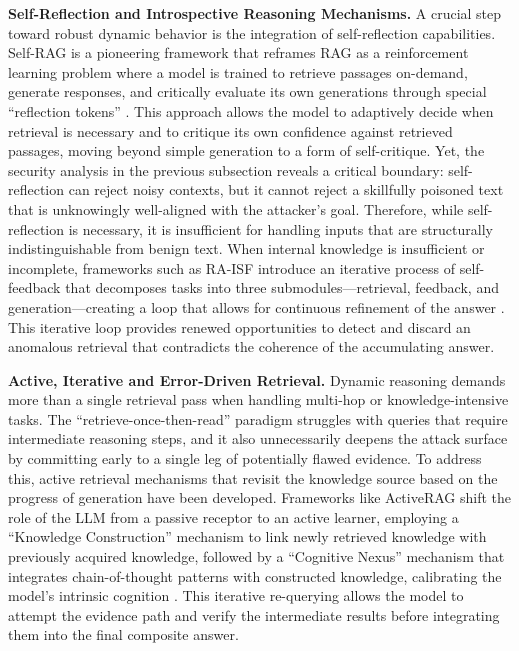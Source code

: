 \documentclass[11pt]{article}
\begin{document}
\textbf{Self-Reflection and Introspective Reasoning Mechanisms.} A crucial step toward robust dynamic behavior is the integration of self-reflection capabilities. Self-RAG is a pioneering framework that reframes RAG as a reinforcement learning problem where a model is trained to retrieve passages on-demand, generate responses, and critically evaluate its own generations through special ``reflection tokens'' \cite{ref109}. This approach allows the model to adaptively decide when retrieval is necessary and to critique its own confidence against retrieved passages, moving beyond simple generation to a form of self-critique. Yet, the security analysis in the previous subsection reveals a critical boundary: self-reflection can reject noisy contexts, but it cannot reject a skillfully poisoned text that is unknowingly well-aligned with the attacker's goal. Therefore, while self-reflection is necessary, it is insufficient for handling inputs that are structurally indistinguishable from benign text. When internal knowledge is insufficient or incomplete, frameworks such as RA-ISF introduce an iterative process of self-feedback that decomposes tasks into three submodules---retrieval, feedback, and generation---creating a loop that allows for continuous refinement of the answer \cite{ref5}. This iterative loop provides renewed opportunities to detect and discard an anomalous retrieval that contradicts the coherence of the accumulating answer.

\textbf{Active, Iterative and Error-Driven Retrieval.} Dynamic reasoning demands more than a single retrieval pass when handling multi-hop or knowledge-intensive tasks. The ``retrieve-once-then-read'' paradigm struggles with queries that require intermediate reasoning steps, and it also unnecessarily deepens the attack surface by committing early to a single leg of potentially flawed evidence. To address this, active retrieval mechanisms that revisit the knowledge source based on the progress of generation have been developed. Frameworks like ActiveRAG shift the role of the LLM from a passive receptor to an active learner, employing a ``Knowledge Construction'' mechanism to link newly retrieved knowledge with previously acquired knowledge, followed by a ``Cognitive Nexus'' mechanism that integrates chain-of-thought patterns with constructed knowledge, calibrating the model's intrinsic cognition \cite{ref177}. This iterative re-querying allows the model to attempt the evidence path and verify the intermediate results before integrating them into the final composite answer.
\end{document}
